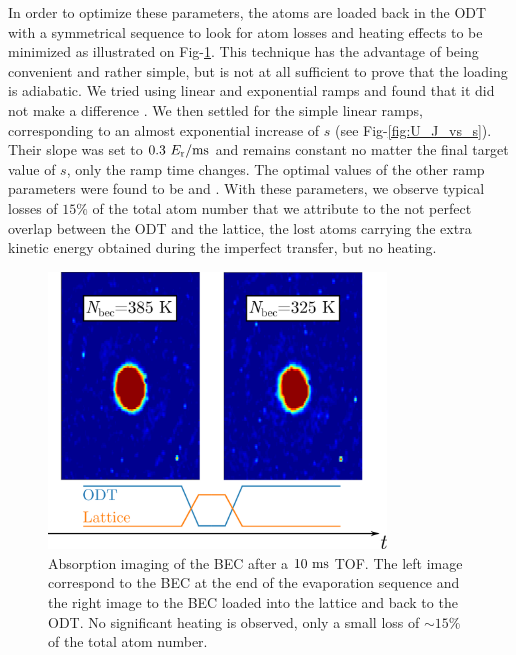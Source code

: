 In order to optimize these parameters, the atoms are loaded back in the ODT with a symmetrical sequence to look for atom losses and heating effects to be minimized as illustrated on Fig-\ref{fig:lattice_up_and_down}. This technique has the advantage of being convenient and rather simple, but is not at all sufficient to prove that the loading is adiabatic. We tried using linear and exponential ramps and found that it did not make a difference \cite{carcy_these}. We then settled for the simple linear ramps, corresponding to an almost exponential increase of $s$ (see Fig-\ref{fig:U_J_vs_s}). Their slope was set to $0.3 \ E_{\rm{r}}/\rm{ms}$ and remains constant no matter the final target value of $s$, only the ramp time changes. The optimal values of the other ramp parameters were found to be  and . With these parameters, we observe typical losses of $15 \%$ of the total atom number that we attribute to the not perfect overlap between the ODT and the lattice, the lost atoms carrying the extra kinetic energy obtained during the imperfect transfer, but no heating. 

\begin{figure}
    \centering
    \includegraphics[width=0.8\textwidth]{Fig/Chapter3/lattice_up_and_down.png}
    \caption[Characterisation of the lattice ramps]{Absorption imaging of the BEC after a $10 \ \rm{ms}$ TOF. The left image correspond to the BEC at the end of the evaporation sequence and the right image to the BEC loaded into the lattice and back to the ODT. No significant heating is observed, only a small loss of $\sim 15 \%$ of the total atom number.}
    \label{fig:lattice_up_and_down}
\end{figure}

